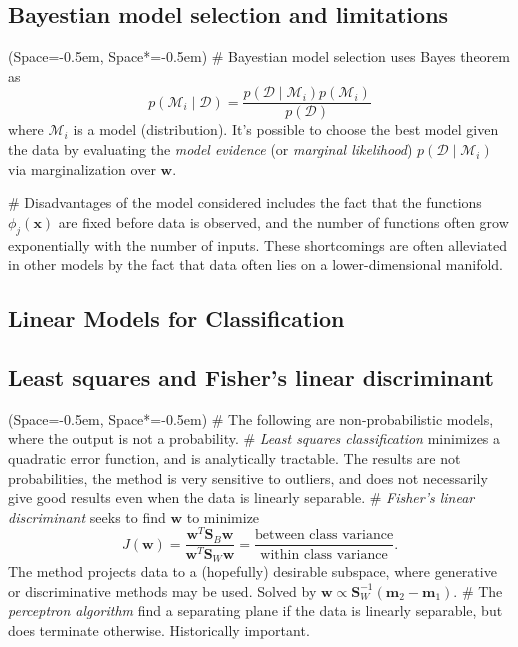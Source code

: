 \documentclass[12pt, a4paper]{article}
\newcommand{\listSpace}{-0.5em}%
\newcommand{\D}{\mathcal{D}}
\newcommand{\vect}[1]{\bm{#1}}
\begin{document}
\subsection*{Bayestian model selection and limitations}
\begin{easylist}[itemize]
	\ListProperties(Space=\listSpace, Space*=\listSpace)
	# Bayestian model selection uses Bayes theorem as
	\begin{equation*}
		p( \mathcal{M}_i \mid \D) = \frac{p( \D \mid \mathcal{M}_i) p( \mathcal{M}_i )}{p( \D)}
	\end{equation*}
	where $\mathcal{M}_i$ is a model (distribution).
	It's possible to choose the best model given the data by evaluating the \emph{model evidence} (or \emph{marginal likelihood}) $p( \D \mid \mathcal{M}_i)$ via marginalization over $\vect{w}$.
	
	# Disadvantages of the model considered includes the fact that the functions $\phi_j(\vect{x})$ are fixed before data is observed, and the number of functions often grow exponentially with the number of inputs.
	These shortcomings are often alleviated in other models by the fact that data often lies on a lower-dimensional manifold.
\end{easylist}

\subsection{Linear Models for Classification}

\subsection*{Least squares and Fisher's linear discriminant}
\begin{easylist}[itemize]
	\ListProperties(Space=\listSpace, Space*=\listSpace)
	# The following are non-probabilistic models, where the output is not a probability.
	# \emph{Least squares classification} minimizes a quadratic error function, and is analytically tractable.
	The results are not probabilities, the method is very sensitive to outliers, and does not necessarily give good results even when the data is linearly separable.
	# \emph{Fisher's linear discriminant} seeks to find $\vect{w}$ to minimize
	\begin{equation*}
		J(\vect{w}) = 
		\frac{\vect{w}^T \vect{S}_{B} \vect{w}}{\vect{w}^T \vect{S}_{W} \vect{w}}
		= 
		\frac{\text{between class variance}}{\text{within class variance}}.
	\end{equation*}
	The method projects data to a (hopefully) desirable subspace, where generative or discriminative methods may be used.
	Solved by $\vect{w} \propto \vect{S}_{W}^{-1} \left( \vect{m}_2 - \vect{m}_1 \right)$.
	# The \emph{perceptron algorithm} find a separating plane if the data is linearly separable, but does terminate otherwise.
	Historically important.
\end{easylist}
\end{document}
